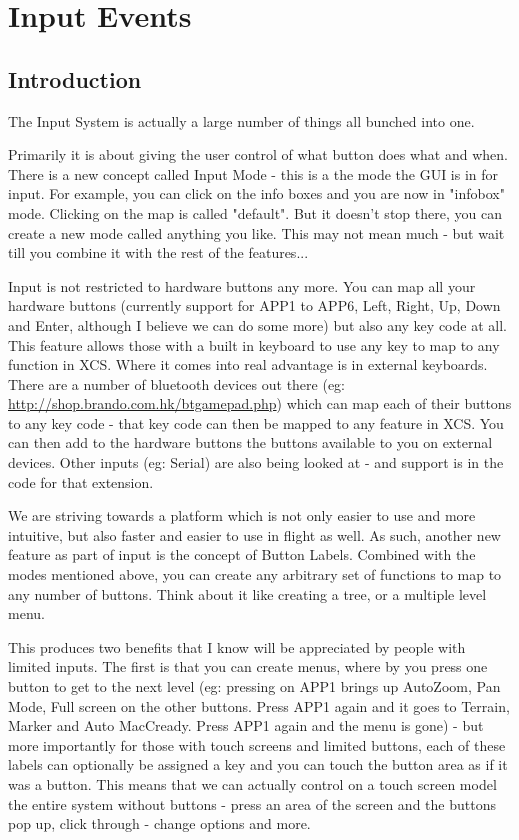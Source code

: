 \section{Input Events}

\subsection{Introduction}

The Input System is actually a large number of things all bunched into one.

Primarily it is about giving the user control of what button does what
and when. There is a new concept called Input Mode - this is a the
mode the GUI is in for input. For example, you can click on the info
boxes and you are now in "infobox" mode. Clicking on the map is called
"default". But it doesn't stop there, you can create a new mode called
anything you like. This may not mean much - but wait till you combine
it with the rest of the features...

Input is not restricted to hardware buttons any more. You can map all
your hardware buttons (currently support for APP1 to APP6, Left,
Right, Up, Down and Enter, although I believe we can do some more) but
also any key code at all. This feature allows those with a built in
keyboard to use any key to map to any function in XCS. Where it comes
into real advantage is in external keyboards. There are a number of
bluetooth devices out there (eg: \url{http://shop.brando.com.hk/btgamepad.php})
which can map each of their
buttons to any key code - that key code can then be mapped to any
feature in XCS. You can then add to the hardware buttons the buttons
available to you on external devices. Other inputs (eg: Serial) are
also being looked at - and support is in the code for that extension.

We are striving towards a platform which is not only easier to use and
more intuitive, but also faster and easier to use in flight as
well. As such, another new feature as part of input is the concept of
Button Labels. Combined with the modes mentioned above, you can create
any arbitrary set of functions to map to any number of buttons. Think
about it like creating a tree, or a multiple level menu.

This produces two benefits that I know will be appreciated by people
with limited inputs. The first is that you can create menus, where by
you press one button to get to the next level (eg: pressing on APP1
brings up AutoZoom, Pan Mode, Full screen on the other buttons. Press
APP1 again and it goes to Terrain, Marker and Auto MacCready. Press
APP1 again and the menu is gone) - but more importantly for those with
touch screens and limited buttons, each of these labels can optionally
be assigned a key and you can touch the button area as if it was a
button.  This means that we can actually control on a touch screen
model the entire system without buttons - press an area of the screen
and the buttons pop up, click through - change options and more.

